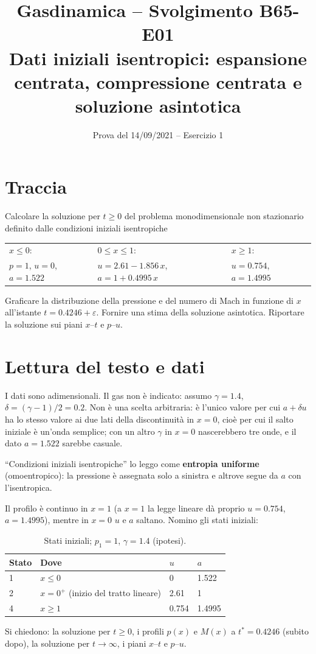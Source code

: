 \documentclass[11pt,a4paper]{article}
\title{Gasdinamica -- Svolgimento B65-E01\\[2pt]
\large Dati iniziali isentropici: espansione centrata, compressione centrata e soluzione asintotica}
\author{}
\date{Prova del 14/09/2021 -- Esercizio 1}
\begin{document}
\maketitle

\section*{Traccia}
Calcolare la soluzione per $t\ge0$ del problema monodimensionale non stazionario definito dalle condizioni
iniziali isentropiche
\begin{center}
\begin{tabular}{lll}
$x\le0$: & $0\le x\le1$: & $x\ge1$: \\
$p=1$, $u=0$, $a=\num{1.522}$ & $u=\num{2.61}-\num{1.856}\,x$, $a=1+\num{0.4995}\,x$ &
$u=\num{0.754}$, $a=\num{1.4995}$
\end{tabular}
\end{center}
Graficare la distribuzione della pressione e del numero di Mach in funzione di $x$ all'istante
$t=\num{0.4246}+\varepsilon$. Fornire una stima della soluzione asintotica. Riportare la soluzione sui piani
$x$--$t$ e $p$--$u$.

\section{Lettura del testo e dati}
I dati sono adimensionali. Il gas non è indicato: assumo $\gamma=\num{1.4}$, $\delta=(\gamma-1)/2=\num{0.2}$.
Non è una scelta arbitraria: è l'unico valore per cui $a+\delta u$ ha lo stesso valore ai due lati della
discontinuità in $x=0$, cioè per cui il salto iniziale è un'onda semplice; con un altro $\gamma$ in $x=0$
nascerebbero tre onde, e il dato $a=\num{1.522}$ sarebbe casuale.

``Condizioni iniziali isentropiche'' lo leggo come \textbf{entropia uniforme} (omoentropico): la pressione è
assegnata solo a sinistra e altrove segue da $a$ con l'isentropica.

Il profilo è continuo in $x=1$ (a $x=1$ la legge lineare dà proprio $u=\num{0.754}$, $a=\num{1.4995}$), mentre
in $x=0$ $u$ e $a$ saltano. Nomino gli stati iniziali:
\begin{table}[H]
  \centering
  \begin{tabular}{llll}
    \toprule
    Stato & Dove & $u$ & $a$ \\
    \midrule
    1 & $x\le0$ & 0 & \num{1.522} \\
    2 & $x=0^+$ (inizio del tratto lineare) & \num{2.61} & 1 \\
    4 & $x\ge1$ & \num{0.754} & \num{1.4995} \\
    \bottomrule
  \end{tabular}
  \caption{Stati iniziali; $p_1=1$, $\gamma=\num{1.4}$ (ipotesi).}
\end{table}
Si chiedono: la soluzione per $t\ge0$, i profili $p(x)$ e $M(x)$ a $t^*=\num{0.4246}$ (subito dopo),
la soluzione per $t\to\infty$, i piani $x$--$t$ e $p$--$u$.
\end{document}
